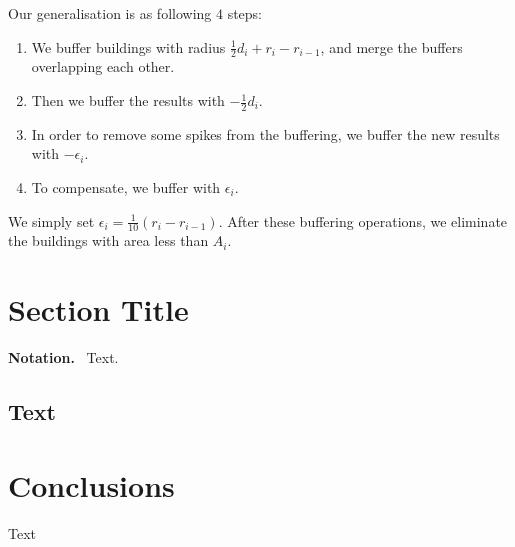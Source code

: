 \documentclass[graybox]{svmult}
\newcommand{\mypar}[1]{\bigskip\noindent\textbf{#1.}~}
\begin{document}
Our generalisation is as following $4$ steps:
\begin{enumerate}[label=(\alph*),leftmargin=2\parindent]
	\item We buffer buildings with 
	radius $\frac{1}{2}d_i+r_i-r_{i-1}$, and merge the buffers 
	overlapping each other.
	\item Then we buffer the results with $-\frac{1}{2}d_i$.
	\item In order to 
	remove some spikes from the buffering, we buffer the new 
	results with $-\epsilon_i$.
	\item To compensate, we buffer with $\epsilon_i$.	
\end{enumerate}
We simply set 
$\epsilon_i=\frac{1}{10}(r_i-r_{i-1})$. After these buffering 
operations, we eliminate the buildings with area less than 
$A_i$.







\section{Section Title}
\label{sec:AStarAlgorithm}

\mypar{Notation}
Text. 

\subsection{Text}
\label{sec:Formalizing}



\section{Conclusions}
\label{sec:Conclusions}

Text

\printbibliography
%
%
\end{document}
